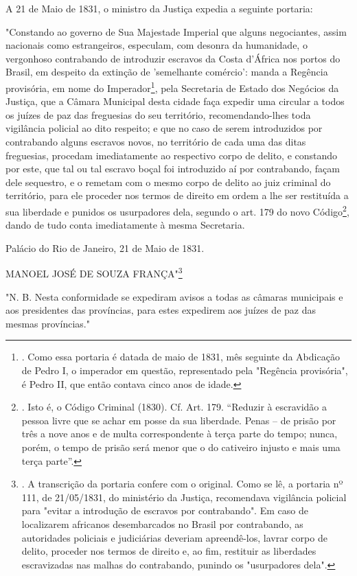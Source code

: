 A 21 de Maio de 1831, o ministro da Justiça expedia a seguinte portaria:

"Constando ao governo de Sua Majestade Imperial que alguns negociantes,
assim nacionais como estrangeiros, especulam, com desonra da humanidade,
o vergonhoso contrabando de introduzir escravos da Costa d'África nos
portos do Brasil, em despeito da extinção de 'semelhante comércio':
manda a Regência provisória, em nome do Imperador\footnote{. Como essa
  portaria é datada de maio de 1831, mês seguinte da Abdicação de Pedro
  I, o imperador em questão, representado pela "Regência provisória", é
  Pedro II, que então contava cinco anos de idade.}, pela Secretaria de
Estado dos Negócios da Justiça, que a Câmara Municipal desta cidade faça
expedir uma circular a todos os juízes de paz das freguesias do seu
território, recomendando-lhes toda vigilância policial ao dito respeito;
e que no caso de serem introduzidos por contrabando alguns escravos
novos, no território de cada uma das ditas freguesias, procedam
imediatamente ao respectivo corpo de delito, e constando por este, que
tal ou tal escravo boçal foi introduzido aí por contrabando, façam dele
sequestro, e o remetam com o mesmo corpo de delito ao juiz criminal do
território, para ele proceder nos termos de direito em ordem a lhe ser
restituída a sua liberdade e punidos os usurpadores dela, segundo o art.
179 do novo Código\footnote{. Isto é, o Código Criminal (1830). Cf. Art.
  179. ``Reduzir à escravidão a pessoa livre que se achar em posse da
  sua liberdade. Penas -- de prisão por três a nove anos e de multa
  correspondente à terça parte do tempo; nunca, porém, o tempo de prisão
  será menor que o do cativeiro injusto e mais uma terça parte''.},
dando de tudo conta imediatamente à mesma Secretaria.

Palácio do Rio de Janeiro, 21 de Maio de 1831.

MANOEL JOSÉ DE SOUZA FRANÇA"\footnote{. A transcrição da portaria
  confere com o original. Como se lê, a portaria nº 111, de 21/05/1831,
  do ministério da Justiça, recomendava vigilância policial para "evitar
  a introdução de escravos por contrabando". Em caso de localizarem
  africanos desembarcados no Brasil por contrabando, as autoridades
  policiais e judiciárias deveriam apreendê-los, lavrar corpo de delito,
  proceder nos termos de direito e, ao fim, restituir as liberdades
  escravizadas nas malhas do contrabando, punindo os "usurpadores dela".}

"N. B. Nesta conformidade se expediram avisos a todas as câmaras
municipais e aos presidentes das províncias, para estes expedirem aos
juízes de paz das mesmas províncias."

